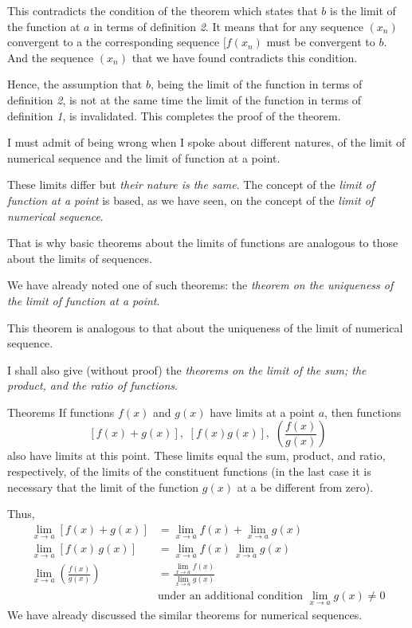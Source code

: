 {This contradicts the condition of the theorem which states that $b$ is the limit of the function at $a$ in terms of definition \emph{2}. It means that for any sequence $(x_{n} )$ convergent to a the corresponding sequence $[f (x_{n} )$  must be convergent to $b$. And the sequence $(x_{n})$ that we have found contradicts this condition.

Hence, the assumption that $b$, being the limit of the function in terms of definition \emph{2}, is not at the same time the limit of the function in terms of definition \emph{1}, is invalidated. This completes the proof of the theorem.

\rdr I must admit of being wrong when I spoke about different natures, of the limit of numerical sequence and the limit of function at a point.

\athr These limits differ but \emph{their nature is the same}. The concept of the \emph{limit of function at a point} is based, as we have seen, on the concept of the \emph{limit of numerical sequence}.

That is why basic theorems about the limits of functions are analogous to those about the limits of sequences.

\rdr We have already noted one of such theorems: the \emph{theorem on the uniqueness of the limit of function at a point}.

\athr This theorem is analogous to that about the uniqueness of the limit of numerical sequence.

I shall also give (without proof) the \emph{theorems on the limit of the sum; the product, and the ratio of functions}.

\begin{mytheo}{Theorems}
If functions $f(x)$ and $g(x)$ have limits at a point $a$, then functions
\begin{equation*}%
\left[f (x) + g (x) \right], \,\, \left[f (x) g (x) \right], \,\, \left( \frac{f(x)}{g(x)} \right)
\end{equation*}
also have limits at this point. These limits equal the sum, product, and ratio, respectively, of the limits of the constituent functions (in the last case it is necessary that the limit of the function $g (x)$ at a be different from zero).
\end{mytheo}
Thus,
\begin{align*}
\lim\limits_{x \to a} [f (x) +g (x)] & = \lim\limits_{x \to a} f (x) + \lim\limits_{x \to a} g (x)\\[5pt]
\lim\limits_{x \to a} [f(x) \, g(x)]& = \lim\limits_{x \to a} f(x) \, \lim\limits_{x \to a} g(x)\\[5pt]
\lim\limits_{x \to a} \left( \frac{f(x)}{g(x)} \right) & = \frac{\lim\limits_{x \to a} f(x)}{\lim\limits_{x \to a} g(x)} \\[5pt]
& \text{under an additional condition} \,\, \lim\limits_{x \to a} g(x) \neq 0
\end{align*}
\rdr We have already discussed the similar theorems for numerical sequences.

}
